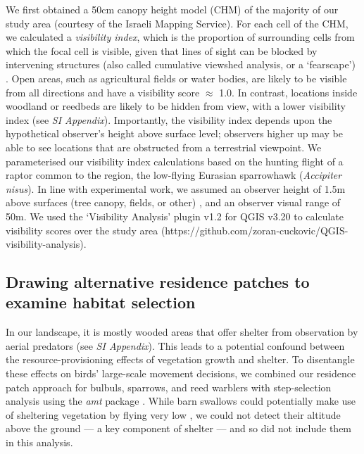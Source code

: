 \begin{refsection}
We first obtained a 50cm canopy height model (CHM) \citep{aben2021} of the majority of our study area (courtesy of the Israeli Mapping Service).
For each cell of the CHM, we calculated a \textit{visibility index}, which is the proportion of surrounding cells from which the focal cell is visible, given that lines of sight can be blocked by intervening structures (also called cumulative viewshed analysis, or a `fearscape') \cite{olsoy2015}.
Open areas, such as agricultural fields or water bodies, are likely to be visible from all directions and have a visibility score $\approx$ 1.0.
In contrast, locations inside woodland or reedbeds are likely to be hidden from view, with a lower visibility index (see \textit{SI Appendix}).
Importantly, the visibility index depends upon the hypothetical observer's height above surface level; observers higher up may be able to see locations that are obstructed from a terrestrial viewpoint.
We parameterised our visibility index calculations based on the hunting flight of a raptor common to the region, the low-flying Eurasian sparrowhawk (\textit{Accipiter nisus}).
In line with experimental work, we assumed an observer height of 1.5m above surfaces (tree canopy, fields, or other) \citep{seress2011}, and an observer visual range of 50m.
We used the `Visibility Analysis' plugin v1.2 for QGIS v3.20 to calculate visibility scores over the study area (https://github.com/zoran-cuckovic/QGIS-visibility-analysis).

\subsection*{Drawing alternative residence patches to examine habitat selection}

In our landscape, it is mostly wooded areas that offer shelter from observation by aerial predators (see \textit{SI Appendix}).
This leads to a potential confound between the resource-provisioning effects of vegetation growth and shelter.
To disentangle these effects on birds' large-scale movement decisions, we combined our residence patch approach for bulbuls, sparrows, and reed warblers with step-selection analysis \citep{thurfjell2014,avgar2016,fieberg2021} using the \textit{amt} package \citep{signer2019}.
While barn swallows could potentially make use of sheltering vegetation by flying very low \cite{warrick2016}, we could not detect their altitude above the ground --- a key component of shelter --- and so did not include them in this analysis.


\end{refsection}
